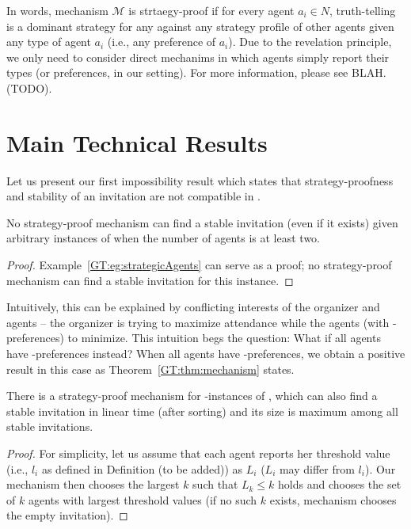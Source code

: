 In words, mechanism $\mathcal{M}$ is strtaegy-proof if for every agent $a_i\in N$, truth-telling is a dominant strategy for any against any strategy profile of other agents given any type of agent $a_i$ (i.e., any preference of $a_i$). Due to the revelation principle, we only need to consider direct mechanims in which agents simply report their types (or preferences, in our setting). For more information, please see BLAH. (TODO).


\section{Main Technical Results} \label{GT:sec:Mechanism}

Let us present our first impossibility result which states that strategy-proofness and stability of an invitation are not compatible in \ASIP. 

\begin{theorem} \label{GT:thm:impossibility}
No strategy-proof mechanism can find a stable invitation (even if it exists) given arbitrary instances of \ASIPs when the number of agents is at least two.
\end{theorem}
\begin{proof}
Example~\ref{GT:eg:strategicAgents} can serve as a proof; no strategy-proof mechanism can find a stable invitation for this instance.
\end{proof}

Intuitively, this can be explained by conflicting interests of the organizer and agents -- the organizer is trying to maximize attendance while the agents (with \DEC-preferences) to minimize. 
This intuition begs the question: What if all agents have \INC-preferences instead? When all agents have \INC-preferences, we obtain a positive result in this case as Theorem~\ref{GT:thm:mechanism} states. 

\begin{theorem} \label{GT:thm:mechanism}
	There is a strategy-proof mechanism for \INC-instances of \ASIP, which can also find a stable invitation in linear time (after sorting) and its size is maximum among all stable invitations.
\end{theorem}
\begin{proof}
For simplicity, let us assume that each agent reports her threshold value (i.e., $l_i$ as defined in Definition (to be added)) as $L_i$ ($L_i$ may differ from $l_i$). Our mechanism then chooses the largest $k$ such that $L_k \leq k$ holds and chooses the set of $k$ agents with largest threshold values (if no such $k$ exists, mechanism chooses the empty invitation). 
\end{proof}


